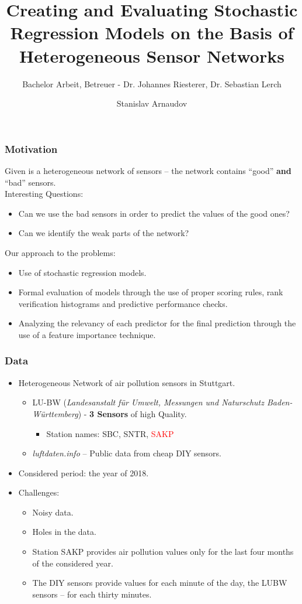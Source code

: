 \documentclass[18pt]{beamer}
\title[Short title]{Creating and Evaluating Stochastic Regression Models on the Basis of Heterogeneous Sensor Networks}
\subtitle{Bachelor Arbeit, Betreuer - Dr. Johannes Riesterer, Dr. Sebastian Lerch}
\author{Stanislav Arnaudov}
\institute{TECO - Das Telecooperation Office}
\begin{document}
 



\begin{frame}
  \titlepage
\end{frame}

\begin{frame}
  \frametitle{Motivation}  
  Given is a heterogeneous network of sensors -- the network contains ``good'' \textbf{and} ``bad'' sensors.\\
  Interesting Questions:
  \begin{itemize}
  \item Can we use the bad sensors in order to predict the values of the good ones?
  \item Can we identify the weak parts of the network?
  \end{itemize}
  Our approach to the problems:
  \begin{itemize}
  \item Use of stochastic regression models.
  \item Formal evaluation of models through the use of proper scoring rules, rank verification histograms and predictive performance checks.
  \item Analyzing the relevancy of each predictor for the final prediction through the use of a feature importance technique.
  \end{itemize}
\end{frame}

\begin{frame}
  \frametitle{Data}
  \begin{itemize}
  \item Heterogeneous Network of air pollution sensors in Stuttgart.\\
    \begin{itemize}
    \item LU-BW (\textit{Landesanstalt für Umwelt, Messungen und Naturschutz Baden-Württemberg}) - \textbf{3 Sensors} of high Quality.
      \begin{itemize}
      \item Station names: SBC, SNTR, \textcolor{red}{SAKP}
      \end{itemize}
    \item \textit{luftdaten.info} -- Public data from cheap DIY sensors.
    \end{itemize}
  \item Considered period: the year of 2018.
  \item Challenges:
    \begin{itemize}
    \item Noisy data.
    \item Holes in the data.
    \item Station SAKP provides air pollution values only for the last four months of the considered year.
    \item The DIY sensors provide values for each minute of the day, the LUBW sensors -- for each thirty minutes.
    \end{itemize}
  \end{itemize}
\end{frame}
\end{document}

